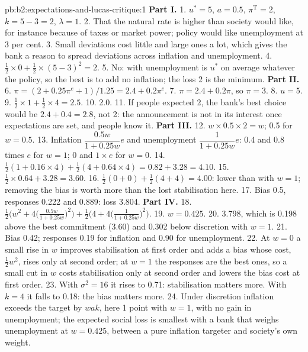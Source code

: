 \begin{solution}{pb:b2:expectations-and-lucas-critique:1}
\textbf{Part I.}
1. $u^* = 5$, $a = 0.5$, $\pi^{\mathrm T} = 2$, $k = 5 - 3 = 2$, $\lambda = 1$.
2. That the natural rate is higher than society would like, for instance because of taxes or market power; policy would
like unemployment at 3 per cent.
3. Small deviations cost little and large ones a lot, which gives the bank a reason to spread deviations across inflation
and unemployment.
4. $\tfrac12 \times 0 + \tfrac12 \times (5 - 3)^2 = 2$.
5. No: with  unemployment is $u^*$ on average whatever the policy, so the best is to add no inflation; the loss
2 is the minimum.
\textbf{Part II.}
6. $\pi = (2 + 0.25\pi^e + 1)/1.25 = 2.4 + 0.2\pi^e$.
7. $\pi = 2.4 + 0.2\pi$, so $\pi = 3$.
8. $u = 5$.
9. $\tfrac12 \times 1 + \tfrac12 \times 4 = 2.5$.
10. 2.0.
11. If people expected 2, the bank's best choice would be $2.4 + 0.4 = 2.8$, not 2: the announcement is not in its interest once expectations are
set, and people know it.
\textbf{Part III.}
12. $w \times 0.5 \times 2 = w$; 0.5 for $w = 0.5$.
13. Inflation $\dfrac{0.5w}{1 + 0.25w}e$ and unemployment $\dfrac{1}{1 + 0.25w}e$: 0.4 and 0.8 times $e$ for $w = 1$; 0 and $1 \times e$ for $w = 0$.
14. $\tfrac12(1 + 0.16 \times 4) + \tfrac12(4 + 0.64 \times 4) = 0.82 + 3.28 = 4.10$.
15. $\tfrac12 \times 0.64 + 3.28 = 3.60$.
16. $\tfrac12(0 + 0) + \tfrac12(4 + 4) = 4.00$: lower than with $w = 1$; removing the bias is worth more than the lost stabilisation here.
17. Bias 0.5, responses 0.222 and 0.889: loss 3.804.
\textbf{Part IV.}
18. $\tfrac12\bigl(w^2 + 4\bigl(\tfrac{0.5w}{1 + 0.25w}\bigr)^2\bigr) + \tfrac12\bigl(4 + 4\bigl(\tfrac{1}{1 + 0.25w}\bigr)^2\bigr)$.
19. $w = 0.425$.
20. 3.798, which is 0.198 above the best commitment (3.60) and 0.302 below discretion with $w = 1$.
21. Bias 0.42; responses 0.19 for inflation and 0.90 for unemployment.
22. At $w = 0$ a small rise in $w$ improves stabilisation at first order and adds a bias whose cost, $\tfrac12w^2$, rises only at second order; at
$w = 1$ the responses are the best ones, so a small cut in $w$ costs stabilisation only at second order and lowers the bias cost at
first order.
23. With $\sigma^2 = 16$ it rises to 0.71: stabilisation matters more. With $k = 4$ it falls to 0.18: the bias matters more.
24. Under discretion inflation exceeds the target by $wak$, here 1 point with $w = 1$, with no gain in unemployment; the expected social loss is
smallest with a bank that weighs unemployment at $w = 0.425$, between a pure inflation targeter and society's own weight.
\end{solution}
